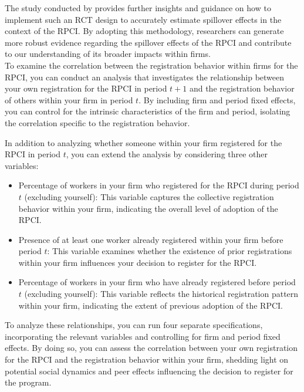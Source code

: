 \documentclass[10pt, oneside]{book}
\begin{document}
The study conducted by \cite{vazquez2022identification} provides further insights and guidance on how to implement such an RCT design to accurately estimate spillover effects in the context of the RPCI. By adopting this methodology, researchers can generate more robust evidence regarding the spillover effects of the RPCI and contribute to our understanding of its broader impacts within firms. \\

To examine the correlation between the registration behavior within firms for the RPCI, you can conduct an analysis that investigates the relationship between your own registration for the RPCI in period $t+1$ and the registration behavior of others within your firm in period $t$. By including firm and period fixed effects, you can control for the intrinsic characteristics of the firm and period, isolating the correlation specific to the registration behavior.

In addition to analyzing whether someone within your firm registered for the RPCI in period $t$, you can extend the analysis by considering three other variables:

\begin{itemize}
    \item Percentage of workers in your firm who registered for the RPCI during period $t$ (excluding yourself): This variable captures the collective registration behavior within your firm, indicating the overall level of adoption of the RPCI.
    \item Presence of at least one worker already registered within your firm before period $t$: This variable examines whether the existence of prior registrations within your firm influences your decision to register for the RPCI.
    \item Percentage of workers in your firm who have already registered before period $t$ (excluding yourself): This variable reflects the historical registration pattern within your firm, indicating the extent of previous adoption of the RPCI.
\end{itemize}

To analyze these relationships, you can run four separate specifications, incorporating the relevant variables and controlling for firm and period fixed effects. By doing so, you can assess the correlation between your own registration for the RPCI and the registration behavior within your firm, shedding light on potential social dynamics and peer effects influencing the decision to register for the program. \\
\end{document}

